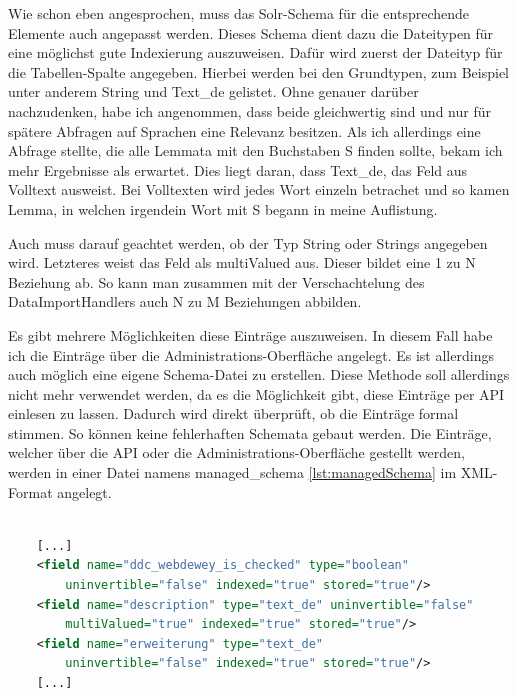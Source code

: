 Wie schon eben angesprochen, muss das Solr-Schema für die entsprechende Elemente auch angepasst werden. Dieses Schema dient dazu die Dateitypen für eine möglichst gute Indexierung auszuweisen. Dafür wird zuerst der Dateityp für die Tabellen-Spalte angegeben. Hierbei werden bei den Grundtypen, zum Beispiel unter anderem String und Text\_de gelistet. Ohne genauer darüber nachzudenken, habe ich angenommen, dass beide gleichwertig sind und nur für spätere Abfragen auf Sprachen eine Relevanz besitzen. Als ich allerdings eine Abfrage stellte, die alle Lemmata mit den Buchstaben S finden sollte, bekam ich mehr Ergebnisse als erwartet. Dies liegt daran, dass Text\_de, das Feld aus Volltext ausweist. 
Bei Volltexten wird jedes Wort einzeln betrachet und so kamen Lemma, in welchen irgendein Wort mit S begann in meine Auflistung. 

Auch muss darauf geachtet werden, ob der Typ String oder Strings angegeben wird. Letzteres weist das Feld als multiValued aus. Dieser bildet eine 1 zu N Beziehung ab. So kann man zusammen mit der Verschachtelung des DataImportHandlers auch N zu M Beziehungen abbilden.

Es gibt mehrere Möglichkeiten diese Einträge auszuweisen. In diesem Fall habe ich die Einträge über die Administrations-Oberfläche angelegt. Es ist allerdings auch möglich eine eigene Schema-Datei zu erstellen. Diese Methode soll allerdings nicht mehr verwendet werden, da es die Möglichkeit gibt, diese Einträge per API einlesen zu lassen. Dadurch wird direkt überprüft, ob die Einträge formal stimmen. So können keine fehlerhaften Schemata gebaut werden. Die Einträge, welcher über die API oder die Administrations-Oberfläche gestellt werden, werden in einer Datei namens managed\_schema \ref{lst:managedSchema} im XML-Format angelegt.


\begin{lstlisting}[language=xml, frame=single, label={lst:managedSchema}, 
    morekeywords={type,uninvertible,indexed,stored,field,multiValued, name}] 

    [...]
    <field name="ddc_webdewey_is_checked" type="boolean" 
        uninvertible="false" indexed="true" stored="true"/>
    <field name="description" type="text_de" uninvertible="false" 
        multiValued="true" indexed="true" stored="true"/>
    <field name="erweiterung" type="text_de" 
        uninvertible="false" indexed="true" stored="true"/>
    [...]

\end{lstlisting}


